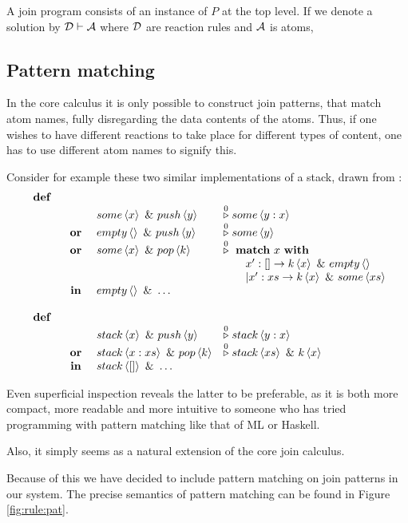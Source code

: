 A join program consists of an instance of $P$ at the top level. If we denote a
solution by $\mathcal{D} \vdash \mathcal{A}$ where $\mathcal{D}$ are reaction rules and $\mathcal{A}$ is atoms,

\subsection{Pattern matching}
In the core calculus it is only possible to construct join patterns, that match
atom names, fully disregarding the data contents of the atoms. Thus, if one wishes
to have different reactions to take place for different types of content, one
has to use different atom names to signify this.

Consider for example these two similar implementations of a stack, drawn from \cite{MaMa2008AlgPat} :
\begin{displaymath}
\begin{array}{rcll}
\defJ
\\ & &  \atm some<x> \andJ \atm push<y>&\toJ0 \atm some<y:x>
\\ &\orJ&\atm empty<> \andJ \atm push<y> &\toJ0 \atm some<y>
\\ &\orJ&\atm some<x> \andJ \atm pop<k> &\toJ0  \match x \with
\\ &&& \qquad         x':[] \to \atm k<x> \andJ \atm empty<>
\\ &&& \qquad    | x':xs \to \atm k<x> \andJ \atm some<xs>
\\&\inJ& \atm empty<> \andJ \ldots
\\
\\\defJ &&&
\\ & &   \atm stack<x> \andJ \atm push<y> &\toJ0 \atm stack<y:x>
\\&\orJ&  \atm stack<x:xs> \andJ \atm pop<k>& \toJ0 \atm stack<xs> \andJ \atm k<x>
\\&\inJ& \atm stack<[]> \andJ \ldots
\end{array}
\end{displaymath}

Even superficial inspection reveals the latter to be preferable, as it is both
more compact, more readable and more intuitive to someone who has tried
programming with pattern matching like that of ML or Haskell.

Also, it simply seems as a natural extension of the core join calculus.

Because of this we have decided to include pattern matching on join patterns in our system.
The precise semantics of pattern matching can be found in Figure \ref{fig:rule:pat}.

